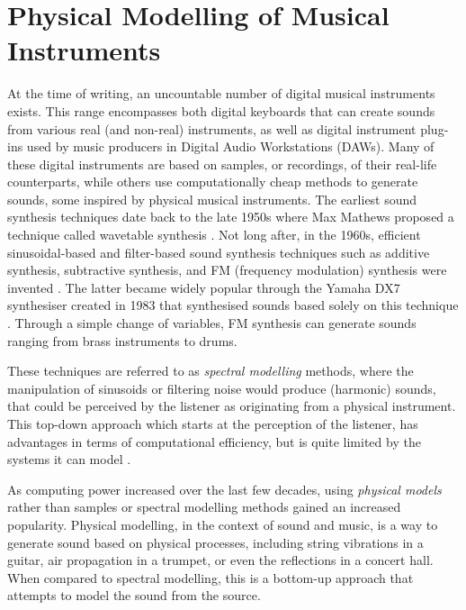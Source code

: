 \chapter{Physical Modelling of Musical Instruments}\label{ch:physMod}
 At the time of writing, an uncountable number of digital musical instruments exists. This range encompasses both digital keyboards that can create sounds from various real (and non-real) instruments, as well as digital instrument plug-ins used by music producers in Digital Audio Workstations (DAWs). Many of these digital instruments are based on samples, or recordings, of their real-life counterparts, while others use computationally cheap methods to generate sounds, some inspired by physical musical instruments. The earliest sound synthesis techniques date back to the late 1950s where Max Mathews proposed a technique called wavetable synthesis \cite{Puckette2002}. Not long after, in the 1960s, efficient sinusoidal-based and filter-based sound synthesis techniques such as additive synthesis, subtractive synthesis, and FM (frequency modulation) synthesis were invented \cite{Roads1996, Chowning1973}. The latter became widely popular through the Yamaha DX7 synthesiser created in 1983 that synthesised sounds based solely on this technique \cite{DX7}. Through a simple change of variables, FM synthesis can generate sounds ranging from brass instruments to drums. 

These techniques are referred to as \textit{spectral modelling} methods, where the manipulation of sinusoids or filtering noise would produce (harmonic) sounds, that could be perceived by the listener as originating from a physical instrument. This top-down approach which starts at the perception of the listener, has advantages in terms of computational efficiency, but is quite limited by the systems it can model \cite{Smith2010a}. 

As computing power increased over the last few decades, using \textit{physical models} rather than samples or spectral modelling methods gained an increased popularity.
Physical modelling, in the context of sound and music, is a way to generate sound based on physical processes, including string vibrations in a guitar, air propagation in a trumpet, or even the reflections in a concert hall. When compared to spectral modelling, this is a bottom-up approach that attempts to model the sound from the source.  

